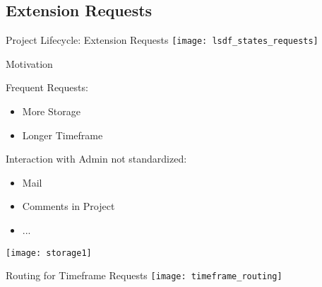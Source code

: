 \subsection{Extension Requests}

\begin{frame}[c]{Project Lifecycle: Extension Requests}
    \texttt{[image: lsdf\_states\_requests]}
\end{frame}

\begin{frame}[c]{Motivation}
    \begin{multicols}{2}
        Frequent Requests:
        \begin{itemize}[<+(1)->]
            \item More Storage
            \item Longer Timeframe
        \end{itemize}
        \pause
        Interaction with Admin not standardized:
        \begin{itemize}[<+(1)->]
            \item Mail
            \item Comments in Project
            \item ...
        \end{itemize}
        \texttt{[image: storage1]}
    \end{multicols}
\end{frame}



\begin{frame}[c]{Routing for Timeframe Requests}
    \large
    \texttt{[image: timeframe\_routing]}
\end{frame}


